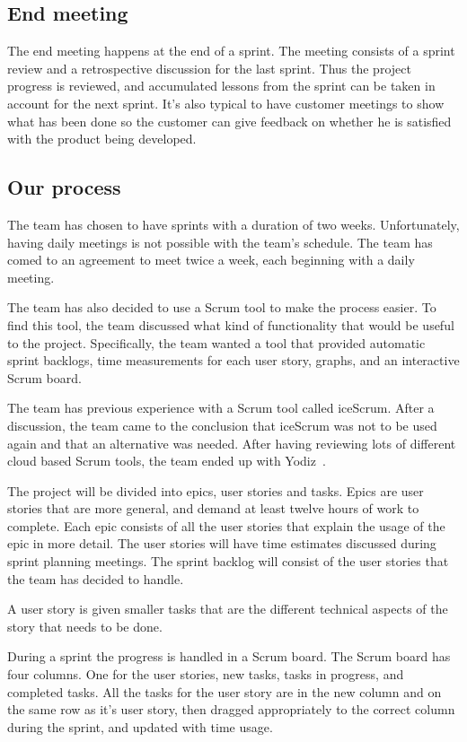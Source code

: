 \subsection{End meeting}
The end meeting happens at the end of a sprint. The meeting consists of a sprint review and a retrospective discussion 
for the last sprint.
Thus the project progress is reviewed, and accumulated lessons from the sprint can be taken in account for the
next sprint.
It's also typical to have customer meetings to show what has been done so the customer can give feedback on 
whether he is satisfied with the product being developed.

\subsection{Our process}
The team has chosen to have sprints with a duration of two weeks. Unfortunately, having daily meetings is not 
possible with the team's schedule.
The team has comed to an agreement to meet twice a week, each beginning with a daily meeting.

The team has also decided to use a Scrum tool to make the process easier.
To find this tool, the team discussed what kind of functionality that would be useful to the project. 
Specifically, the team wanted a tool that provided automatic sprint backlogs, time measurements for each user story, 
graphs, and an interactive Scrum board.

The team has previous experience with a Scrum tool called iceScrum. After a discussion, the team came to the conclusion 
that iceScrum was not to be used again and that an alternative was needed.
After having reviewing lots of different cloud based Scrum tools, the team ended up with Yodiz~\cite{yodiz}.

The project will be divided into epics, user stories and tasks. Epics are user stories that are more general, 
and demand at least twelve hours of work to complete. Each epic consists
of all the user stories that explain the usage of the epic in more detail.
The user stories will have time estimates discussed during sprint planning meetings.
The sprint backlog will consist of the user stories that the team has decided to handle.

A user story is given smaller tasks that are the different technical aspects of the story that needs to be done.

During a sprint the progress is handled in a Scrum board. The Scrum board has four columns. One for the user stories, new tasks, tasks in progress, and completed tasks.
All the tasks for the user story are in the new column and on the same row as it's user story, then dragged appropriately to the correct column during the sprint, and updated with time usage.
